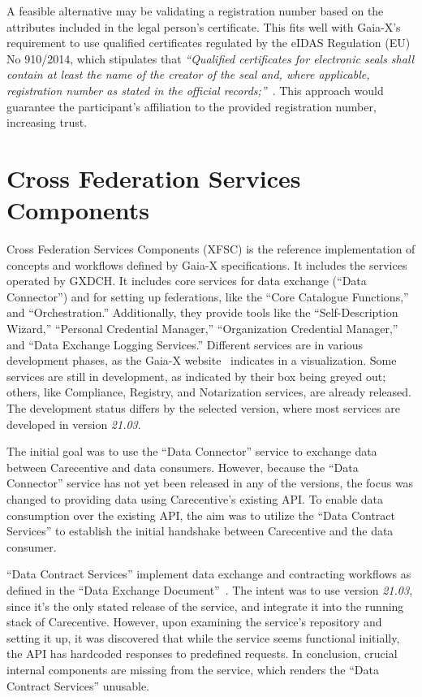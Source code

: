 A feasible alternative may be validating a registration number based on the attributes included in the legal person's certificate.
This fits well with Gaia-X's requirement to use qualified certificates regulated by the eIDAS Regulation (EU) No 910/2014, which stipulates that \textit{``Qualified certificates for electronic seals shall contain at least the name of the creator of the seal and, where applicable, registration number as stated in the official records;''}~\cite{eidas}.
This approach would guarantee the participant's affiliation to the provided registration number, increasing trust.

\section{Cross Federation Services Components}\label{sec:cross-federation-services-components}

Cross Federation Services Components (XFSC) is the reference implementation of concepts and workflows defined by Gaia-X specifications.
It includes the services operated by GXDCH.
It includes core services for data exchange (``Data Connector'') and for setting up federations, like the ``Core Catalogue Functions,'' and ``Orchestration.''
Additionally, they provide tools like the ``Self-Description Wizard,'' ``Personal Credential Manager,'' ``Organization Credential Manager,'' and ``Data Exchange Logging Services.''
Different services are in various development phases, as the Gaia-X website~\cite{gaiax} indicates in a visualization.
Some services are still in development, as indicated by their box being greyed out; others, like Compliance, Registry, and Notarization services, are already released.
The development status differs by the selected version, where most services are developed in version \textit{21.03}.

The initial goal was to use the ``Data Connector'' service to exchange data between Carecentive and data consumers.
However, because the ``Data Connector'' service has not yet been released in any of the versions, the focus was changed to providing data using Carecentive's existing API.
To enable data consumption over the existing API, the aim was to utilize the ``Data Contract Services'' to establish the initial handshake between Carecentive and the data consumer.

``Data Contract Services'' implement data exchange and contracting workflows as defined in the ``Data Exchange Document''~\cite{gaiax_data_exchange_document}.
The intent was to use version \textit{21.03}, since it's the only stated release of the service, and integrate it into the running stack of Carecentive.
However, upon examining the service's repository and setting it up, it was discovered that while the service seems functional initially, the API has hardcoded responses to predefined requests.
In conclusion, crucial internal components are missing from the service, which renders the ``Data Contract Services'' unusable.

